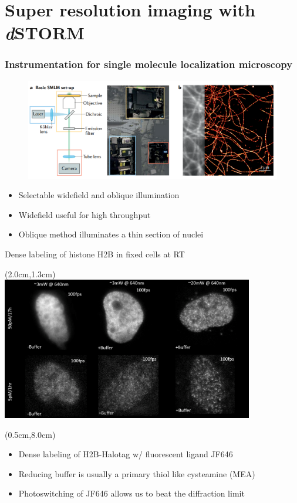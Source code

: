 \documentclass{beamer}					%
\begin{document}
\section{Super resolution imaging with \textit{d}STORM}
\begin{frame}
\frametitle{Instrumentation for single molecule localization microscopy}

\begin{figure}
\includegraphics[width=12cm]{Setup.png}
\end{figure}

\begin{itemize}
\item Selectable widefield and oblique illumination
\item Widefield useful for high throughput 
\item Oblique method illuminates a thin section of nuclei
\end{itemize}

\end{frame}

\begin{frame}{Dense labeling of histone H2B in fixed cells at RT}
\begin{textblock*}{11cm}(2.0cm,1.3cm)
\includegraphics[width=11cm]{Laser.png}
\end{textblock*}
\begin{textblock*}{\textwidth}(0.5cm,8.0cm)
\begin{itemize}
\item Dense labeling of H2B-Halotag w/ fluorescent ligand JF646
\item Reducing buffer is usually a primary thiol like cysteamine (MEA)
\item Photoswitching of JF646 allows us to beat the diffraction limit
\end{itemize}
\end{textblock*}
\end{frame}
\end{document}
